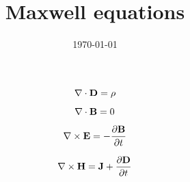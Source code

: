 \documentclass{article}
\begin{document}
\title{Maxwell equations}
\date{\today}
\maketitle


\begin{equation}
\nabla\cdot{\bf D} = \rho 
\end{equation}

\begin{equation}
\nabla\cdot{\bf B} = 0 
\end{equation}

\begin{equation}
\nabla\times{\bf E} = - {{\partial{\bf B}}\over{\partial t}} 
\end{equation}

\begin{equation}
\nabla\times{\bf H} = {\bf J} + {{\partial{\bf D}}\over{\partial t}} 
\end{equation}
\end{document}
